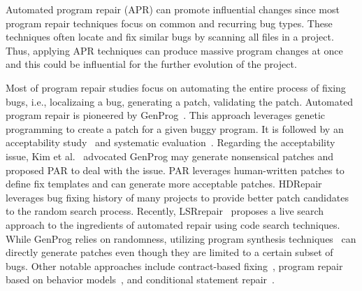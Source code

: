 Automated program repair (APR) can promote influential changes since most
program repair techniques focus on common and recurring bug types.
These techniques often locate and fix similar bugs by scanning all files in a project.
Thus, applying APR techniques can produce massive program changes at once
and this could be influential for the further evolution of the project.




Most of program repair studies focus on automating the entire process of fixing bugs, i.e., localizaing a bug, 
generating a patch, validating the patch.
Automated program repair is pioneered by GenProg~\cite{weimer2009automatically,le2012genprog}. This approach leverages genetic programming to create a patch for a given buggy program. It is followed by an acceptability study~\cite{fry2012human} and systematic evaluation~\cite{le2012systematic}. Regarding the acceptability issue, Kim et al.~\cite{kim2013automatic} advocated GenProg may generate nonsensical patches and proposed PAR to deal with the issue. PAR leverages human-written patches to define fix templates and can generate more acceptable patches. 
HDRepair~\cite{le2016history} leverages bug fixing history of many projects to provide better patch candidates to the random search process.
Recently, LSRrepair~\cite{kui2018live} proposes a live search approach to the ingredients of automated repair using code search techniques. 
While GenProg relies on randomness, utilizing program synthesis techniques~\cite{nguyen2013semfix,mechtaev2016angelix,mechtaev2015directfix} can directly generate patches even though they are limited to a certain subset of bugs.
Other notable approaches include contract-based fixing~\cite{wei2010automated}, program repair based on behavior models~\cite{dallmeier2009generating}, and conditional statement repair~\cite{xuan2017nopol}. 

